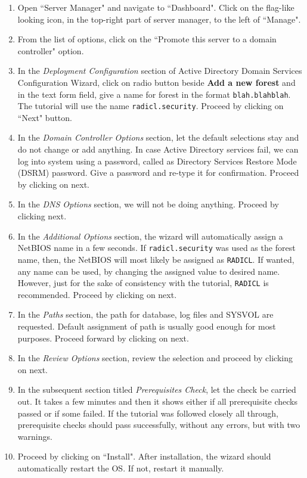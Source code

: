 \documentclass[12pt]{extarticle}
\begin{document}
\begin{enumerate}
	\item Open ``Server Manager" and navigate to ``Dashboard". Click on the flag-like looking icon, in the top-right part of server manager, to the left of ``Manage".
	\item From the list of options, click on the ``Promote this server to a domain controller" option.
	\item In the \textit{Deployment Configuration} section of Active Directory Domain Services Configuration Wizard, click on radio button beside \textbf{Add a new forest} and in the text form field, give a name for forest in the format \texttt{blah.blahblah}. The tutorial will use the name \texttt{radicl.security}. Proceed by clicking on ``Next" button.
	\item In the \textit{Domain Controller Options} section, let the default selections stay and do not change or add anything. In case Active Directory services fail, we can log into system using a password, called as Directory Services Restore Mode (DSRM) password. Give a password and re-type it for confirmation. Proceed by clicking on next.
	\item In the \textit{DNS Options} section, we will not be doing anything. Proceed by clicking next.
	\item In the \textit{Additional Options} section, the wizard will automatically assign a NetBIOS name in a few seconds. If \texttt{radicl.security} was used as the forest name, then, the NetBIOS will most likely be assigned as \texttt{RADICL}. If wanted, any name can be used, by changing the assigned value to desired name. However, just for the sake of consistency with the tutorial, \texttt{RADICL} is recommended. Proceed by clicking on next.
	\item In the \textit{Paths} section, the path for database, log files and SYSVOL are requested. Default assignment of path is usually good enough for most purposes. Proceed forward by clicking on next.
	\item In the \textit{Review Options} section, review the selection and proceed by clicking on next.
	\item In the subsequent section titled \textit{Prerequisites Check}, let the check be carried out. It takes a few minutes and then it shows either if all prerequisite checks passed or if some failed. If the tutorial was followed closely all through, prerequisite checks should pass successfully, without any errors, but with two warnings.
	\item Proceed by clicking on ``Install". After installation, the wizard should automatically restart the OS. If not, restart it manually.
\end{enumerate}
\end{document}

